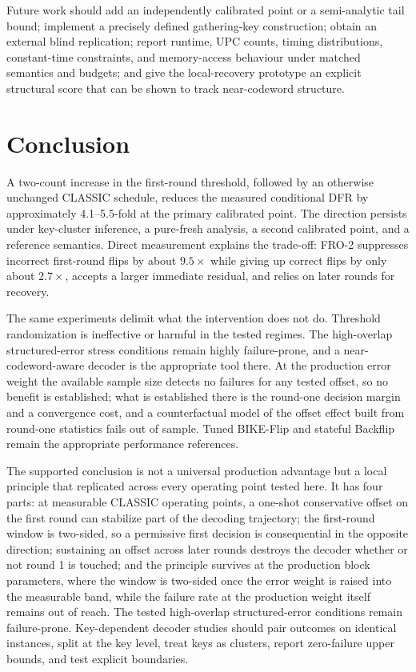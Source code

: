 \documentclass[lettersize,journal]{IEEEtran}
\begin{document}
Future work should add an independently calibrated point or a semi-analytic tail bound; implement a precisely defined gathering-key construction; obtain an external blind replication; report runtime, UPC counts, timing distributions, constant-time constraints, and memory-access behaviour under matched semantics and budgets; and give the local-recovery prototype an explicit structural score that can be shown to track near-codeword structure.

\section{Conclusion}\label{sec:conclusion}

A two-count increase in the first-round threshold, followed by an otherwise unchanged CLASSIC schedule, reduces the measured conditional DFR by approximately 4.1--5.5-fold at the primary calibrated point. The direction persists under key-cluster inference, a pure-fresh analysis, a second calibrated point, and a reference semantics. Direct measurement explains the trade-off: FRO-2 suppresses incorrect first-round flips by about $9.5\times$ while giving up correct flips by only about $2.7\times$, accepts a larger immediate residual, and relies on later rounds for recovery.

The same experiments delimit what the intervention does not do. Threshold randomization is ineffective or harmful in the tested regimes. The high-overlap structured-error stress conditions remain highly failure-prone, and a near-codeword-aware decoder is the appropriate tool there. At the production error weight the available sample size detects no failures for any tested offset, so no benefit is established; what is established there is the round-one decision margin and a convergence cost, and a counterfactual model of the offset effect built from round-one statistics fails out of sample. Tuned BIKE-Flip and stateful Backflip remain the appropriate performance references.

The supported conclusion is not a universal production advantage but a local principle that replicated across every operating point tested here. It has four parts: at measurable CLASSIC operating points, a one-shot conservative offset on the first round can stabilize part of the decoding trajectory; the first-round window is two-sided, so a permissive first decision is consequential in the opposite direction; sustaining an offset across later rounds destroys the decoder whether or not round 1 is touched; and the principle survives at the production block parameters, where the window is two-sided once the error weight is raised into the measurable band, while the failure rate at the production weight itself remains out of reach. The tested high-overlap structured-error conditions remain failure-prone. Key-dependent decoder studies should pair outcomes on identical instances, split at the key level, treat keys as clusters, report zero-failure upper bounds, and test explicit boundaries.
\end{document}
